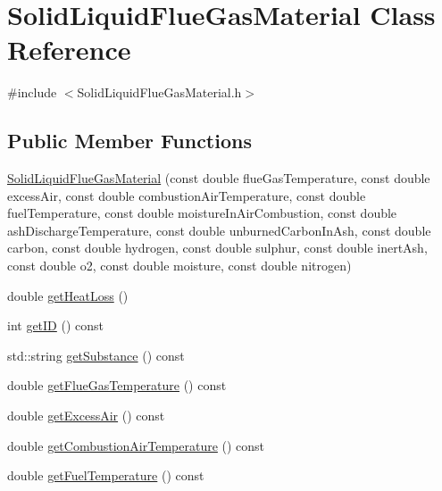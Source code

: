 \hypertarget{class_solid_liquid_flue_gas_material}{}\section{Solid\+Liquid\+Flue\+Gas\+Material Class Reference}
\label{class_solid_liquid_flue_gas_material}


{\ttfamily \#include $<$Solid\+Liquid\+Flue\+Gas\+Material.\+h$>$}

\subsection*{Public Member Functions}
\begin{DoxyCompactItemize}
\item 
\hyperlink{class_solid_liquid_flue_gas_material_a91e7c5e670b3db4fedcbc494448644d5}{Solid\+Liquid\+Flue\+Gas\+Material} (const double flue\+Gas\+Temperature, const double excess\+Air, const double combustion\+Air\+Temperature, const double fuel\+Temperature, const double moisture\+In\+Air\+Combustion, const double ash\+Discharge\+Temperature, const double unburned\+Carbon\+In\+Ash, const double carbon, const double hydrogen, const double sulphur, const double inert\+Ash, const double o2, const double moisture, const double nitrogen)
\item 
double \hyperlink{class_solid_liquid_flue_gas_material_af7d36673e49f9b5eb631fc04227883d6}{get\+Heat\+Loss} ()
\item 
int \hyperlink{class_solid_liquid_flue_gas_material_afb124b546137da7ba99e31616198e0c8}{get\+ID} () const
\item 
std\+::string \hyperlink{class_solid_liquid_flue_gas_material_a6e07a23fb05c15c7e5dba39334988de8}{get\+Substance} () const
\item 
double \hyperlink{class_solid_liquid_flue_gas_material_aba4604158b3c624496d7de4b5fb511e2}{get\+Flue\+Gas\+Temperature} () const
\item 
double \hyperlink{class_solid_liquid_flue_gas_material_a49e7bb4ebc45897c81b6f38610ceaf02}{get\+Excess\+Air} () const
\item 
double \hyperlink{class_solid_liquid_flue_gas_material_a8757b831e5a2ef26dbb0cf271c0e8207}{get\+Combustion\+Air\+Temperature} () const
\item 
double \hyperlink{class_solid_liquid_flue_gas_material_a629ecc7104b6bfbb696d9478c4b48e7a}{get\+Fuel\+Temperature} () const
\item 

\end{DoxyCompactItemize}

